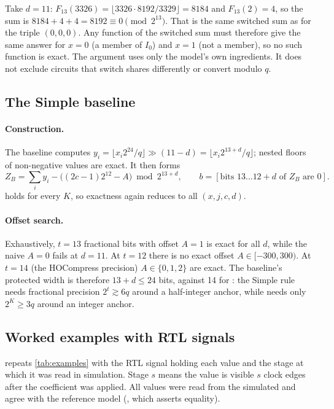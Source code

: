 Take $d = 11$: $F_{13}(3326) = \lfloor 3326 \cdot 8192/3329 \rfloor = 8184$ and $F_{13}(2) = 4$, so the sum is $8184 + 4 + 4 = 8192 \equiv 0 \pmod{2^{13}}$. That is the same switched sum as for the triple $(0, 0, 0)$. Any function of the switched sum must therefore give the same answer for $x = 0$ (a member of $I_0$) and $x = 1$ (not a member), so no such function is exact. The argument uses only the model's own ingredients. It does not exclude circuits that switch shares differently or convert modulo $q$.

\subsection{The Simple baseline}\label{app:baseline}
\paragraph{Construction.} The baseline computes $y_i = \lfloor x_i 2^{24}/q \rfloor \gg (11 - d) = \lfloor x_i 2^{13+d}/q \rfloor$; nested floors of non-negative values are exact. It then forms
\[ Z_B = \sum_i y_i - \bigl((2c - 1)2^{12} - A\bigr) \bmod 2^{13+d}, \qquad b = [\text{bits } 13 \ldots 12 + d \text{ of } Z_B \text{ are } 0] . \]
 holds for every $K$, so exactness again reduces to all $(x, j, c, d)$.

\paragraph{Offset search.} Exhaustively, $t = 13$ fractional bits with offset $A = 1$ is exact for all $d$, while the naive $A = 0$ fails at $d = 11$. At $t = 12$ there is no exact offset $A \in [-300, 300)$. At $t = 14$ (the HOCompress precision) $A \in \{0, 1, 2\}$ are exact. The baseline's protected width is therefore $13 + d \le 24$ bits, against 14 for \PAMS{}: the Simple rule needs fractional precision $2^t \gtrsim 6q$ around a half-integer anchor, while \PAMS{} needs only $2^K \ge 3q$ around an integer anchor.

\subsection{Worked examples with RTL signals}\label{app:math-examples}
 repeats \cref{tab:examples} with the RTL signal holding each value and the stage at which it was read in simulation. Stage $s$ means the value is visible $s$ clock edges after the coefficient was applied. All values were read from the simulated  and agree with the reference model (, which asserts equality).

